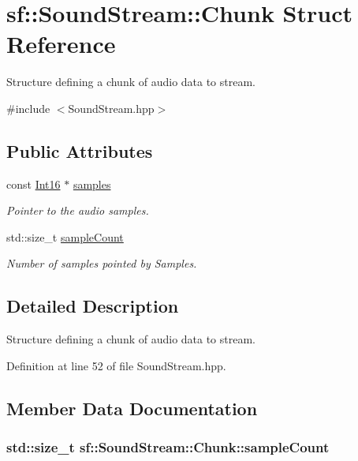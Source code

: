\hypertarget{structsf_1_1_sound_stream_1_1_chunk}{\section{sf\-:\-:Sound\-Stream\-:\-:Chunk Struct Reference}
\label{structsf_1_1_sound_stream_1_1_chunk}
}


Structure defining a chunk of audio data to stream.  




{\ttfamily \#include $<$Sound\-Stream.\-hpp$>$}

\subsection*{Public Attributes}
\begin{DoxyCompactItemize}
\item 
const \hyperlink{namespacesf_a3c8e10435e2a310a7741755e66b5c94e}{Int16} $\ast$ \hyperlink{structsf_1_1_sound_stream_1_1_chunk_aa3b84d69adbe663a17a7671626076df4}{samples}
\begin{DoxyCompactList}\small\item\em Pointer to the audio samples. \end{DoxyCompactList}\item 
std\-::size\-\_\-t \hyperlink{structsf_1_1_sound_stream_1_1_chunk_af47f5d94012acf8b11f056ba77aff97a}{sample\-Count}
\begin{DoxyCompactList}\small\item\em Number of samples pointed by Samples. \end{DoxyCompactList}\end{DoxyCompactItemize}


\subsection{Detailed Description}
Structure defining a chunk of audio data to stream. 

Definition at line 52 of file Sound\-Stream.\-hpp.



\subsection{Member Data Documentation}
\hypertarget{structsf_1_1_sound_stream_1_1_chunk_af47f5d94012acf8b11f056ba77aff97a}{
\subsubsection[{sample\-Count}]{\setlength{\rightskip}{0pt plus 5cm}std\-::size\-\_\-t sf\-::\-Sound\-Stream\-::\-Chunk\-::sample\-Count}}\label{structsf_1_1_sound_stream_1_1_chunk_af47f5d94012acf8b11f056ba77aff97a}


